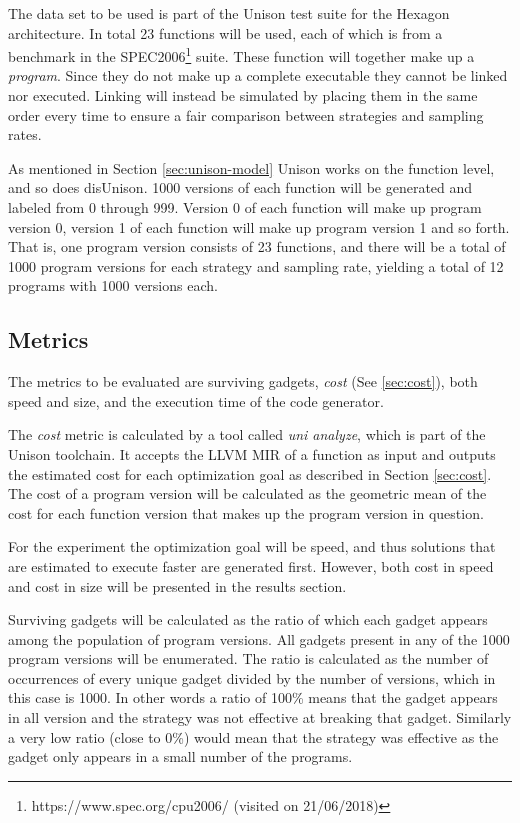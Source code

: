 The data set to be used is part of the Unison test suite for the Hexagon architecture. In
total 23 functions will be used, each of which is from a benchmark in the SPEC2006\footnote{https://www.spec.org/cpu2006/ (visited on 21/06/2018)}
suite. These function will together make up a \textit{program}. Since they do not make up
a complete executable they cannot be linked nor executed. Linking will instead be simulated
by placing them in the same order every time to ensure a fair comparison between
strategies and sampling rates.

As mentioned in Section \ref{sec:unison-model} Unison works on the function level, and so
does disUnison. 1000 versions of each function will be generated and labeled from 0 through
999. Version 0 of each function will make up program version 0, version 1 of each function
will make up program version 1 and so forth. That is, one program version consists of 23
functions, and there will be a total of 1000 program versions for each strategy and
sampling rate, yielding a total of 12 programs with 1000 versions each.

\subsection{Metrics}
\label{sec:metrics}

The metrics to be evaluated are surviving gadgets, \textit{cost} (See \ref{sec:cost}),
both speed and size, and the execution time of the code generator.

The \textit{cost} metric is calculated by a tool called \textit{uni analyze}, which is
part of the Unison toolchain. It accepts the LLVM MIR of a function as input and outputs
the estimated cost for each optimization goal as described in Section \ref{sec:cost}. The
cost of a program version will be calculated as the geometric mean of the cost for each
function version that makes up the program version in question.

For the experiment the optimization goal will be speed, and thus solutions that are
estimated to execute faster are generated first. However, both cost in speed and cost in
size will be presented in the results section.

Surviving gadgets will be calculated as the ratio of which each gadget appears among the
population of program versions. All gadgets present in any of the 1000 program versions
will be enumerated. The ratio is calculated as the number of occurrences of every unique
gadget divided by the number of versions, which in this case is 1000. In other words a
ratio of 100\% means that the gadget appears in all version and the strategy was not
effective at breaking that gadget. Similarly a very low ratio (close to 0\%) would mean
that the strategy was effective as the gadget only appears in a small number of the
programs.


